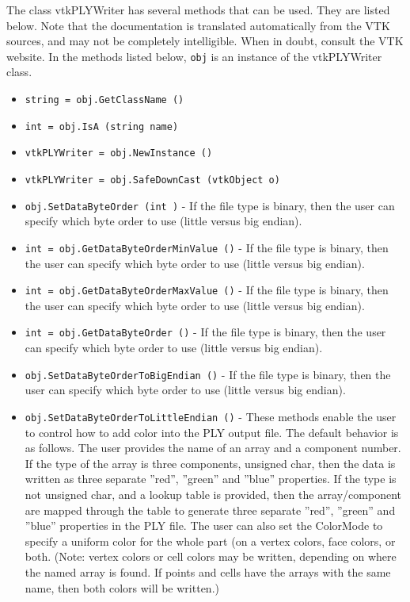The class vtkPLYWriter has several methods that can be used.
  They are listed below.
Note that the documentation is translated automatically from the VTK sources,
and may not be completely intelligible.  When in doubt, consult the VTK website.
In the methods listed below, \verb|obj| is an instance of the vtkPLYWriter class.
\begin{itemize}
\item  \verb|string = obj.GetClassName ()|

\item  \verb|int = obj.IsA (string name)|

\item  \verb|vtkPLYWriter = obj.NewInstance ()|

\item  \verb|vtkPLYWriter = obj.SafeDownCast (vtkObject o)|

\item  \verb|obj.SetDataByteOrder (int )| -  If the file type is binary, then the user can specify which
 byte order to use (little versus big endian).

\item  \verb|int = obj.GetDataByteOrderMinValue ()| -  If the file type is binary, then the user can specify which
 byte order to use (little versus big endian).

\item  \verb|int = obj.GetDataByteOrderMaxValue ()| -  If the file type is binary, then the user can specify which
 byte order to use (little versus big endian).

\item  \verb|int = obj.GetDataByteOrder ()| -  If the file type is binary, then the user can specify which
 byte order to use (little versus big endian).

\item  \verb|obj.SetDataByteOrderToBigEndian ()| -  If the file type is binary, then the user can specify which
 byte order to use (little versus big endian).

\item  \verb|obj.SetDataByteOrderToLittleEndian ()| -  These methods enable the user to control how to add color into the PLY
 output file. The default behavior is as follows. The user provides the
 name of an array and a component number. If the type of the array is
 three components, unsigned char, then the data is written as three
 separate ''red'', ''green'' and ''blue'' properties. If the type is not
 unsigned char, and a lookup table is provided, then the array/component
 are mapped through the table to generate three separate ''red'', ''green''
 and ''blue'' properties in the PLY file. The user can also set the
 ColorMode to specify a uniform color for the whole part (on a vertex
 colors, face colors, or both. (Note: vertex colors or cell colors may be
 written, depending on where the named array is found. If points and
 cells have the arrays with the same name, then both colors will be
 written.)


\end{itemize}
